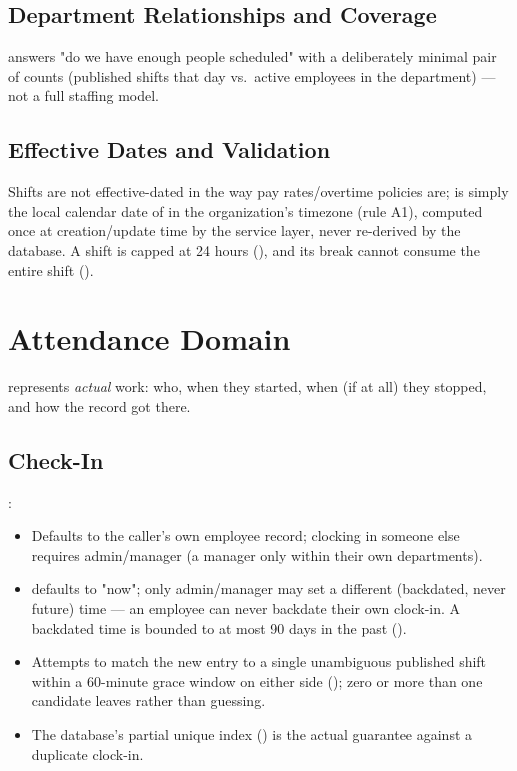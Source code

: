 \subsection*{Department Relationships and Coverage}

 answers "do we have enough people
scheduled" with a deliberately minimal pair of counts (published shifts
that day vs.\ active employees in the department) --- not a full
staffing model.

\subsection*{Effective Dates and Validation}

Shifts are not effective-dated in the way pay rates/overtime policies
are;  is simply the local calendar date of
 in the organization's timezone (rule A1), computed
once at creation/update time by the service layer, never re-derived by
the database. A shift is capped at 24 hours
(), and its break cannot consume the
entire shift ().

\section{Attendance Domain}

 represents \emph{actual} work: who, when they
started, when (if at all) they stopped, and how the record got there.

\subsection*{Check-In}

:

\begin{itemize}[nosep]
  \item Defaults to the caller's own employee record; clocking in
        someone else requires admin/manager (a manager only within
        their own departments).
  \item {} defaults to "now"; only admin/manager may set a
        different (backdated, never future) time --- an employee can
        never backdate their own clock-in. A backdated time is bounded
        to at most 90 days in the past ().
  \item Attempts to match the new entry to a single unambiguous
        published shift within a 60-minute grace window on either
        side (); zero or more than one candidate
        leaves   rather than guessing.
  \item The database's partial unique index
        () is the
        actual guarantee against a duplicate clock-in.
\end{itemize}


